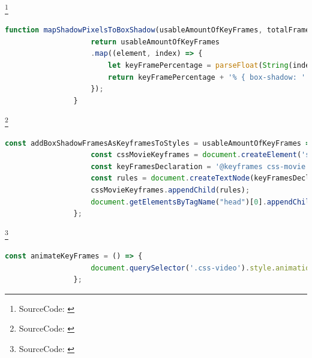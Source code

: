 \documentclass[xcolor=dvipsnames,10pt]{beamer}
\begin{document}
\begin{frame}[fragile]{\secname\footnote{SourceCode: \cite{videoToCss}}}
	\begin{center}
		\begin{minipage}{1\textwidth}
			\begin{lstlisting}[language=JavaScript, caption=mapShadowPixelsToBoxShadow()]
				function mapShadowPixelsToBoxShadow(usableAmountOfKeyFrames, totalFramesLength) {
					return usableAmountOfKeyFrames
					.map((element, index) => {
						let keyFramePercentage = parseFloat(String(index / totalFramesLength)).toFixed(2);
						return keyFramePercentage + '% { box-shadow: ' + element + '}'
					});
				}
			\end{lstlisting}
		\end{minipage}
	\end{center}
\end{frame}
\begin{frame}[fragile]{\secname\footnote{SourceCode: \cite{videoToCss}}}
	\begin{center}
		\begin{minipage}{1\textwidth}
			\begin{lstlisting}[language=JavaScript, caption=addBoxShadowFramesAsKeyframesToStyles()]
				const addBoxShadowFramesAsKeyframesToStyles = usableAmountOfKeyFrames => {
					const cssMovieKeyframes = document.createElement('style');
					const keyFramesDeclaration = '@keyframes css-movie {' + usableAmountOfKeyFrames.join(' ') + '}';
					const rules = document.createTextNode(keyFramesDeclaration);
					cssMovieKeyframes.appendChild(rules);
					document.getElementsByTagName("head")[0].appendChild(cssMovieKeyframes);
				};
			\end{lstlisting}
		\end{minipage}
	\end{center}
\end{frame}
\begin{frame}[fragile]{\secname\footnote{SourceCode: \cite{videoToCss}}}
	\begin{center}
		\begin{minipage}{1\textwidth}
			\begin{lstlisting}[language=JavaScript, caption=animateKeyFrames()]
				const animateKeyFrames = () => {
					document.querySelector('.css-video').style.animation = `css-movie ${cssVideoAnimationLength}s steps(1, end)`;
				};
			\end{lstlisting}
		\end{minipage}
	\end{center}
\end{frame}
\end{document}
